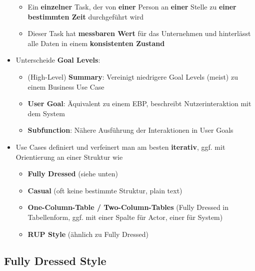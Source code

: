 \begin{itemize}
	\begin{itemize}
		\item Ein \textbf{einzelner} Task, der von \textbf{einer} Person an \textbf{einer} Stelle zu \textbf{einer bestimmten Zeit} durchgeführt wird
		\item Dieser Task hat \textbf{messbaren Wert} für das Unternehmen und hinterlässt alle Daten in einem \textbf{konsistenten Zustand}
	\end{itemize}
	\item Unterscheide \textbf{Goal Levels}:
	\begin{itemize}
		\item (High-Level) \textbf{Summary}: Vereinigt niedrigere Goal Levels (meist) zu einem Business Use Case
		\item \textbf{User Goal}: Äquivalent zu einem EBP, beschreibt Nutzerinteraktion mit dem System
		\item \textbf{Subfunction}: Nähere Ausführung der Interaktionen in User Goals
	\end{itemize}
	\item Use Cases definiert und verfeinert man am besten \textbf{iterativ}, ggf. mit Orientierung an einer Struktur wie
	\begin{itemize}
		\item \textbf{Fully Dressed} (siehe unten)
		\item \textbf{Casual} (oft keine bestimmte Struktur, plain text)
		\item \textbf{One-Column-Table / Two-Column-Tables} (Fully Dressed in Tabellenform, ggf. mit einer Spalte für Actor, einer für System)
		\item \textbf{RUP Style} (ähnlich zu Fully Dressed)
	\end{itemize}
\end{itemize}

\subsection{Fully Dressed Style}
\label{uc:sub:fully_dressed_style}

